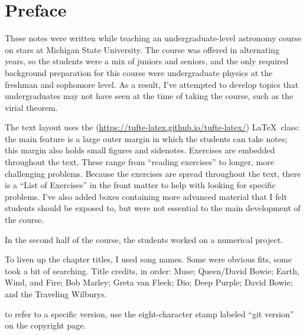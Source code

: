 
\section*{Preface}
These notes were written while teaching an undergraduate-level astronomy course on stars at Michigan State University. The course was offered in alternating years, so the students were a mix of juniors and seniors, and the only required background preparation for this course were undergraduate physics at the freshman and sophomore level. As a result, I've attempted to develop topics that undergraduates may not have seen at the time of taking the course, such as the virial theorem.

The text layout uses the  (\url{https://tufte-latex.github.io/tufte-latex/}) \LaTeX\ class:  the main feature is a large outer margin in which the students can take notes; this margin also holds small figures and sidenotes. Exercises are embedded throughout the text.  These range from ``reading exercises'' to longer, more challenging problems.  Because the exercises are spread throughout the text, there is a ``List of Exercises'' in the front matter to help with looking for specific problems. I've also added boxes containing more advanced material that I felt students should be exposed to, but were not essential to the main development of the course.

In the second half of the course, the students worked on a numerical project.

To liven up the chapter titles, I used song names. Some were obvious fits, some took a bit of searching. Title credits, in order: Muse; Queen/David Bowie; Earth, Wind, and Fire; Bob Marley; Greta van Fleek; Dio; Deep Purple; David Bowie; and the Traveling Wilburys.

 to refer to a specific version, use the eight-character stamp labeled ``git version'' on the copyright page.
